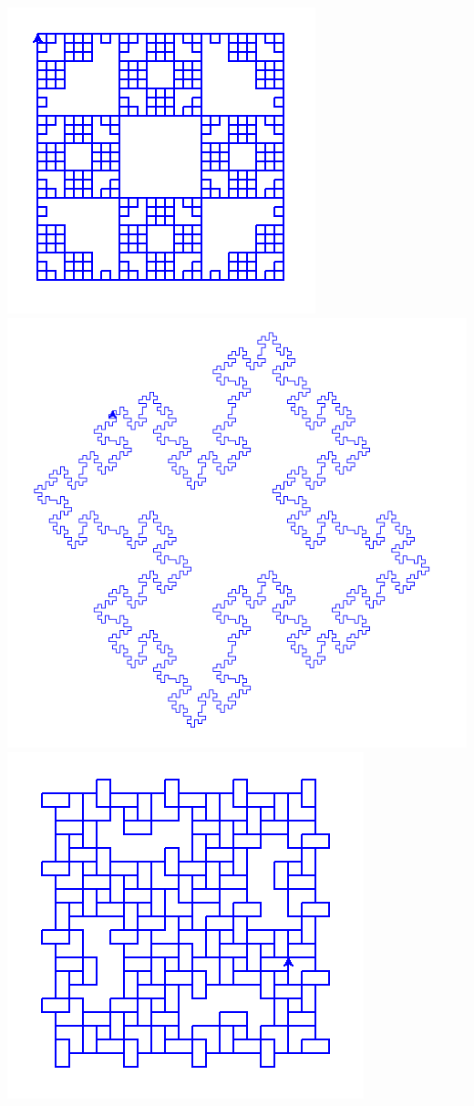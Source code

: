 \documentclass[11pt,class=report,crop=false]{standalone}
\begin{document}
\begin{activite}
\begin{enumerate}
\begin{center}
\includegraphics[scale=0.3]{ecran-lsysteme-4}\quad
\includegraphics[scale=0.2]{ecran-lsysteme-5}\quad
\includegraphics[scale=0.27]{ecran-lsysteme-6}
\end{center}



\end{enumerate}
\end{activite}
\end{document}
